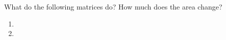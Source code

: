 What do the following matrices do? How much does the area change?

\begin{enumerate}
    \item 
    \item 
\end{enumerate}
